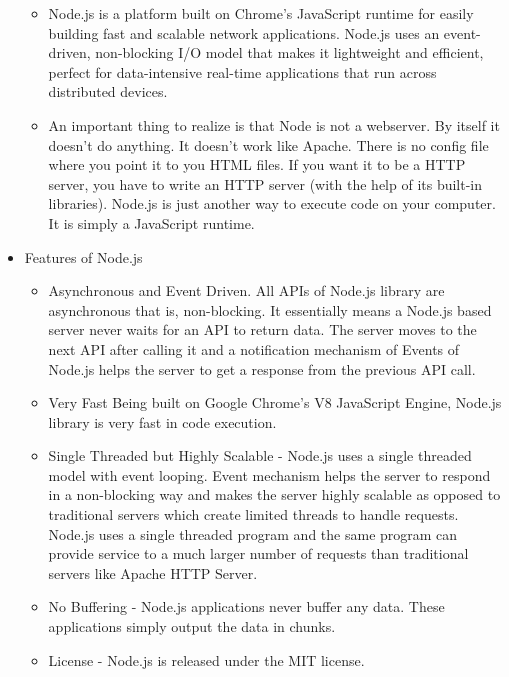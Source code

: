 \documentclass[11pt,a4paper]{article}
\begin{document}
\begin{itemize}
\begin{itemize}
	 	\item Node.js is a platform built on Chrome's JavaScript runtime for easily building fast and scalable network applications. Node.js uses an event-driven, non-blocking I/O model that makes it lightweight and efficient, perfect for data-intensive real-time applications that run across distributed devices.
	 	\item An important thing to realize is that Node is not a webserver. By itself it doesn't do anything. It doesn't work like Apache. There is no config file where you point it to you HTML files. If you want it to be a HTTP server, you have to write an HTTP server (with the help of its built-in libraries). Node.js is just another way to execute code on your computer. It is simply a JavaScript runtime.
	 	\end{itemize}
	 
	 	\item Features of Node.js
	 	\begin{itemize}
	 	\item Asynchronous and Event Driven. All APIs of Node.js library are asynchronous that is, non-blocking. It essentially means a Node.js based server never waits for an API to return data. The server moves to the next API after calling it and a notification mechanism of Events of Node.js helps the server to get a response from the previous API call.

        \item Very Fast Being built on Google Chrome's V8 JavaScript Engine, Node.js library is very fast in code execution.

        \item Single Threaded but Highly Scalable - Node.js uses a single threaded model with event looping. Event mechanism helps the server to respond in a non-blocking way and makes the server highly scalable as opposed to traditional servers which create limited threads to handle requests. Node.js uses a single threaded program and the same program can provide service to a much larger number of requests than traditional servers like Apache HTTP Server.

        \item No Buffering - Node.js applications never buffer any data. These applications simply output the data in chunks.

        \item License - Node.js is released under the MIT license.
        	\end{itemize}
	 	

\end{itemize}
\end{document}
